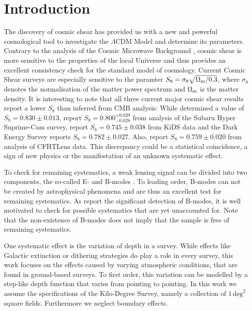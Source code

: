 
\section{Introduction}
The discovery of cosmic shear has provided us with a new and powerful cosmological tool to investigate the $\Lambda$CDM Model and determine its parameters. Contrary to the analysis of the Cosmic Microwave Background \citep{2018arXiv180706209P}, cosmic shear is more sensitive to the properties of the local Universe and thus provides an excellent consistency check for the standard model of cosmology. Current Cosmic Shear surveys are especially sensitive to the paramter $S_8=\sigma_8 \sqrt{\Omega_{\rm m}/0.3}$, where $\sigma_8$ denotes the normalisation of the matter power spectrum and $\Omega_{\rm m}$ is the matter density.
It is interesting to note that all three current major cosmic shear results report a lower $S_8$ than inferred from CMB analysis: While \citet{2018arXiv180706209P} determined a value of $S_8 = 0.830 \pm 0.013$, 
\citet{2018arXiv180909148H} report $S_8 = 0.800^{+0.029}_{-0.028}$ from analysis of the Subaru Hyper Suprime-Cam survey, \citet{2017MNRAS.465.1454H} report $S_8 = 0.745\pm 0.038$ from KiDS data and the Dark Energy Survey \citep{2018PhRvD..98d3528T} reports $S_8=0.782\pm 0.027$. Also, \citet{2013MNRAS.432.2433H} report $S_8 = 0.759 \pm 0.020$ from analysis of CFHTLens data. This discrepancy could be a statistical coincidence, a sign of new physics or the manifestation of an unknown systematic effect. 

To check for remaining systematics, a weak lensing signal can be divided into two components, the so-called E- and B-modes \citet{2002ApJ...568...20C,2002A&A...389..729S}. To leading order, B-modes can not be created by astrophysical phenomena and are thus an excellent test for remaining systematics. As \citet{2017MNRAS.465.1454H} report the significant detection of B-modes, it is well motivated to check for possible systematics that are yet unaccounted for. Note that the non-existence of B-modes does not imply that the sample is free of remaining systematics.

One systematic effect is the variation of depth in a survey. While effects like Galactic extinction or dithering strategies do play a role in every survey, this work focuses on the effects caused by varying atmospheric conditions, that are found in ground-based surveys. To first order, this variation can be modelled by a step-like depth function that varies from pointing to pointing. In this work we assume the specifications of the Kilo-Degree Survey, namely a collection of $1\,\text{deg}^2$ square fields. Furthermore we neglect boundary effects. 

